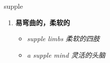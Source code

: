 
\begin{frame}
{\huge supple}
\begin{center}
\begin{enumerate}\Large
  \item \textbf{易弯曲的，柔软的}
  \begin{itemize}
    \item \em{\Large{supple limbs 柔软的四肢}}
    \item \em{\Large{a supple mind 灵活的头脑}}
  \end{itemize}
\end{enumerate}
\end{center}
\end{frame}
